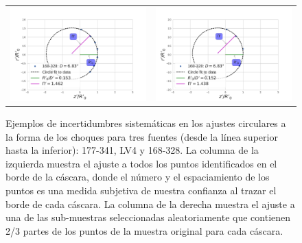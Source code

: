 \begin{figure}
\begin{tabular}{cc}
\includegraphics[clip]{./Programs/LV-bowshocks-xyfancy-positionswill-168-328} &  \includegraphics[clip]{./Programs/Multi-Fit/samp00/LV-bowshocks-xyfancy-positionssamp00-168-328} & 
\end{tabular}
\caption[Ejemplos de incertidumbres sistemáticas en los ajustes circulares a la forma de los choques para tres fuentes.]{Ejemplos de incertidumbres sistemáticas en los ajustes circulares a la forma de los choques para tres fuentes (desde la línea superior hasta la inferior): 177-341, LV4 y 168-328. La columna de la izquierda muestra el ajuste a todos los puntos identificados en el borde de la cáscara, donde el número y el espaciamiento de los puntos es una medida subjetiva de nuestra confianza al trazar el borde de cada cáscara. La columna de la derecha muestra el ajuste a una de las sub-muestras seleccionadas aleatoriamente que contienen 2/3 partes de los puntos de la muestra original para cada cáscara.}
\label{fig:char-radii-obs}
\end{figure}

